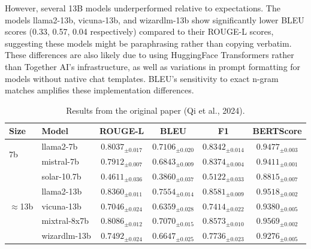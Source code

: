 \documentclass[10pt,letterpaper]{article}
\begin{document}
However, several 13B models underperformed relative to expectations. The models llama2-13b, vicuna-13b, and wizardlm-13b show significantly lower BLEU scores (0.33, 0.57, 0.04 respectively) compared to their ROUGE-L scores, suggesting these models might be paraphrasing rather than copying verbatim. These differences are also likely due to using HuggingFace Transformers rather than Together AI's infrastructure, as well as variations in prompt formatting for models without native chat templates. BLEU's sensitivity to exact n-gram matches amplifies these implementation differences.

\begin{table}[ht]
\centering
\small
\begin{tabular}{@{}llcccc@{}}
\toprule
\textbf{Size} & \textbf{Model} & \textbf{ROUGE-L} & \textbf{BLEU} & \textbf{F1} & \textbf{BERTScore} \\
\midrule
\multirow{2}{*}{7b}
& llama2-7b & $\mathbf{0.8037}_{\pm 0.017}$ & $\mathbf{0.7106}_{\pm 0.020}$ & $0.8342_{\pm 0.014}$ & $\mathbf{0.9477}_{\pm 0.003}$ \\
& mistral-7b & $0.7912_{\pm 0.007}$ & $0.6843_{\pm 0.009}$ & $\mathbf{0.8374}_{\pm 0.004}$ & $0.9411_{\pm 0.001}$ \\
\midrule
\multirow{5}{*}{$\approx$13b}
& solar-10.7b & $0.4611_{\pm 0.036}$ & $0.3860_{\pm 0.037}$ & $0.5122_{\pm 0.033}$ & $0.8815_{\pm 0.007}$ \\
& llama2-13b & $\mathbf{0.8360}_{\pm 0.011}$ & $\mathbf{0.7554}_{\pm 0.014}$ & $\mathbf{0.8581}_{\pm 0.009}$ & $\mathbf{0.9518}_{\pm 0.002}$ \\
& vicuna-13b & $0.7046_{\pm 0.024}$ & $0.6359_{\pm 0.028}$ & $0.7414_{\pm 0.022}$ & $0.9380_{\pm 0.005}$ \\
& mixtral-8x7b & $0.8086_{\pm 0.012}$ & $0.7070_{\pm 0.015}$ & $0.8573_{\pm 0.010}$ & $0.9569_{\pm 0.002}$ \\
& wizardlm-13b & $0.7492_{\pm 0.024}$ & $0.6647_{\pm 0.025}$ & $0.7736_{\pm 0.023}$ & $0.9276_{\pm 0.005}$ \\
\bottomrule
\end{tabular}
\caption{Results from the original paper (Qi et al., 2024).}
\label{tab:paper_results}
\end{table}
\end{document}
